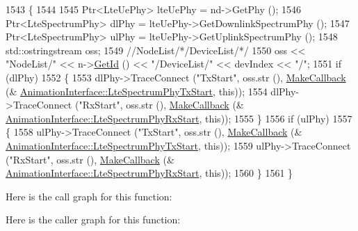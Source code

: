 \begin{DoxyCode}
1543 \{
1544 
1545   Ptr<LteUePhy> lteUePhy = nd->GetPhy ();
1546   Ptr<LteSpectrumPhy> dlPhy = lteUePhy->GetDownlinkSpectrumPhy ();
1547   Ptr<LteSpectrumPhy> ulPhy = lteUePhy->GetUplinkSpectrumPhy ();
1548   std::ostringstream oss;
1549   \textcolor{comment}{//NodeList/*/DeviceList/*/}
1550   oss << \textcolor{stringliteral}{"NodeList/"} << n->\hyperlink{classns3_1_1Node_aaf49b64a843565ce3812326313b370ac}{GetId} () << \textcolor{stringliteral}{"/DeviceList/"} << devIndex << \textcolor{stringliteral}{"/"};
1551   \textcolor{keywordflow}{if} (dlPhy)
1552     \{
1553       dlPhy->TraceConnect (\textcolor{stringliteral}{"TxStart"}, oss.str (), \hyperlink{group__makecallbackmemptr_ga9376283685aa99d204048d6a4b7610a4}{MakeCallback} (&
      \hyperlink{classns3_1_1AnimationInterface_a3f0131dc28ccba541c2ef52bbc920e62}{AnimationInterface::LteSpectrumPhyTxStart}, \textcolor{keyword}{this}));
1554       dlPhy->TraceConnect (\textcolor{stringliteral}{"RxStart"}, oss.str (), \hyperlink{group__makecallbackmemptr_ga9376283685aa99d204048d6a4b7610a4}{MakeCallback} (&
      \hyperlink{classns3_1_1AnimationInterface_a476014043547ee8c36cdbd92324c938f}{AnimationInterface::LteSpectrumPhyRxStart}, \textcolor{keyword}{this}));
1555     \}
1556   \textcolor{keywordflow}{if} (ulPhy)
1557     \{
1558        ulPhy->TraceConnect (\textcolor{stringliteral}{"TxStart"}, oss.str (), \hyperlink{group__makecallbackmemptr_ga9376283685aa99d204048d6a4b7610a4}{MakeCallback} (&
      \hyperlink{classns3_1_1AnimationInterface_a3f0131dc28ccba541c2ef52bbc920e62}{AnimationInterface::LteSpectrumPhyTxStart}, \textcolor{keyword}{this}));
1559        ulPhy->TraceConnect (\textcolor{stringliteral}{"RxStart"}, oss.str (), \hyperlink{group__makecallbackmemptr_ga9376283685aa99d204048d6a4b7610a4}{MakeCallback} (&
      \hyperlink{classns3_1_1AnimationInterface_a476014043547ee8c36cdbd92324c938f}{AnimationInterface::LteSpectrumPhyRxStart}, \textcolor{keyword}{this}));
1560     \}
1561 \}
\end{DoxyCode}


Here is the call graph for this function\+:




Here is the caller graph for this function\+:


